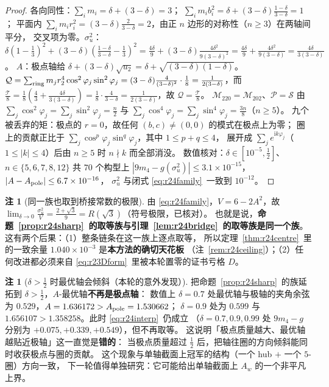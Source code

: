 \documentclass[UTF8,11pt]{ctexart}
\theoremstyle{definition}
\newtheorem{remark}[theorem]{注}
\begin{document}
\begin{proof}
各向同性：$\sum_im_i=\delta+(3-\delta)=3$；
$\sum_im_ib_i^2=\delta+(3-\delta)\frac{1-\delta}{3-\delta}=1$；
平面内 $\sum_im_ir_i^2=(3-\delta)\frac2{3-\delta}=2$，由正 $n$ 边形的对称性（$n\ge3$）在两轴间平分，
交叉项为零。$\sigma_u^2$：
$\delta(1-\frac13)^2+(3-\delta)(\frac{1-\delta}{3-\delta}-\frac13)^2
=\frac{4\delta}9+(3-\delta)\frac{4\delta^2}{9(3-\delta)^2}=\frac{4\delta}9+\frac{4\delta^2}{9(3-\delta)}
=\frac{4\delta}{3(3-\delta)}$。
$A$：极点轴给 $\delta+(3-\delta)\sqrt{u_2}=\delta+\sqrt{(3-\delta)(1-\delta)}$。
$\mathcal{Q}=\sum_{\rm ring}m_jr_2^4\cos^2\varphi_j\sin^2\varphi_j=(3-\delta)\frac{4}{(3-\delta)^2}\cdot\frac18
=\frac1{2(3-\delta)}$，而 $\frac{\mathcal{T}}8=\frac18(\frac43+\frac{4\delta}{3(3-\delta)})
=\frac18\cdot\frac4{3-\delta}=\frac1{2(3-\delta)}$，故 $\mathcal{Q}=\frac{\mathcal{T}}8$。
$\mathcal{M}_{220}=\mathcal{M}_{202}$、$\mathcal{P}=\mathcal{S}$ 由
$\sum_j\cos^2\varphi_j=\sum_j\sin^2\varphi_j=\frac n2$ 与
$\sum_j\cos^4\varphi_j=\sum_j\sin^4\varphi_j=\frac{3n}8$（$n\ge5$）。
九个被丢弃的矩：极点的 $r=0$，故任何 $(b,c)\ne(0,0)$ 的模式在极点上为零；
圈上的贡献正比于 $\sum_j\cos^p\varphi_j\sin^q\varphi_j$，其中 $1\le p+q\le4$，
展开成 $\sum_j e^{\mathrm{i}k\varphi_j}$（$1\le|k|\le4$）后由 $n\ge5$ 时 $n\nmid k$ 而全部消没。
数值核对：$\delta\in[10^{-5},\frac12]$、$n\in\{5,6,7,8,12\}$ 共 $70$ 个构型上
$|9m_4-g(\sigma_u^2)|\le3.1\times10^{-15}$，$|A-A_{\rm pole}|\le6.7\times10^{-16}$，
$\sigma_u^2$ 与闭式 \eqref{eq:r24family}~一致到 $10^{-12}$。
\end{proof}

\begin{remark}[同一族也取到桥接常数的极限]\label{rem:r24samefam}
由 \eqref{eq:r24family}，$V=6-2A^2$，故
$\lim_{\delta\to0}\frac{\sigma_u^2}V=\frac{2+\sqrt3}9=R(\sqrt3)$（符号极限，已核对）。
也就是说，\textbf{命题~\ref{prop:r24sharp}~的取等族与引理~\ref{lem:r24bridge}~的取等族是同一个族}。
这有两个后果：（1）整条链条在这一族上逐点取等，
所以定理~\ref{thm:r24centre}~里的一致余量 $1.040\times10^{-3}$ 是\textbf{本方法的确切天花板}
（注~\ref{rem:r24ceiling}）；（2）任何改进都必须来自
\eqref{eq:r23Dform}~里被本轮置零的证书亏格 $D$。
\end{remark}

\begin{remark}[$\delta>\frac12$ 时最优轴会倾斜（本轮的意外发现）]\label{rem:r24tilt}
把命题~\ref{prop:r24sharp}~的族延拓到 $\delta>\frac12$，$A$-最优轴\textbf{不再是极点轴}：
数值上 $\delta=0.7$ 处最优轴与极轴的夹角余弦为 $0.529$，$A=1.636172>A_{\rm pole}=1.530662$；
$\delta=0.9$ 处为 $0.599$ 与 $1.656107>1.358258$。此时 \eqref{eq:r24interp}~仍成立
（$\delta=0.7,0.9,0.99$ 处 $9m_4-g$ 分别为 $+0.075,+0.339,+0.549$），但不再取等。
这说明「极点质量越大、最优轴越贴近极轴」这一直觉是\textbf{错的}：
当极点质量超过 $\frac12$ 后，把轴往圈的方向倾斜能同时收获极点与圈的贡献。
这个现象与单轴截面上冠军的结构（一个 hub $+$ 一个 $5$-圈）方向一致，
下一轮值得单独研究：它可能给出单轴截面上 $A_w$ 的一个非平凡上界。
\end{remark}
\end{document}
